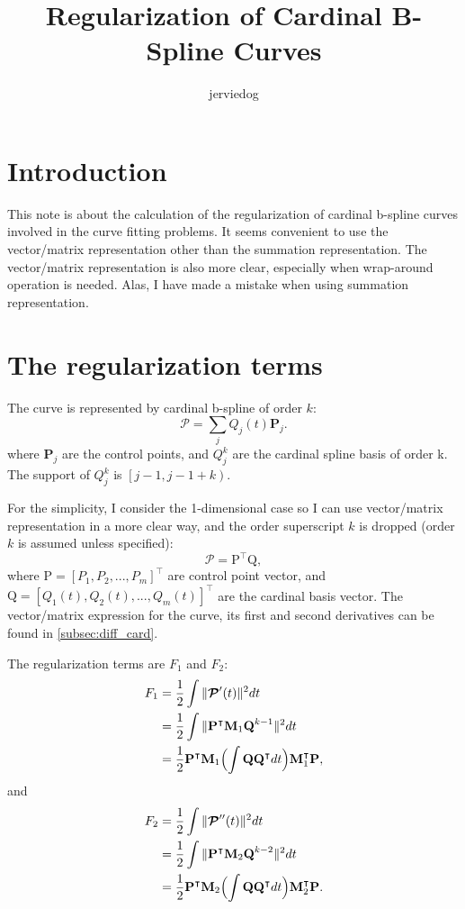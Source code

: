 \documentclass[11pt]{article}
\newcommand{\bmmp}{\bm{\mathcal{P}}} %
\newcommand{\splinept}{\sum_j{Q_j(t)\bm{P}_j}}
\newcommand{\half}{\frac{1}{2}}
\newcommand{\vP}{\bm{\mathrm{P}}} %
\newcommand{\vPT}{\bm{\mathrm{P}}^{\intercal}}
\newcommand{\vQ}{\bm{\mathrm{Q}}} %
\newcommand{\vQT}{\bm{\mathrm{Q}}^{\intercal}} %
\newcommand{\mM}{\mathbf{M}} %
\newcommand{\mMT}{\mathbf{M}^{\intercal}} %
\begin{document}
 
\title{Regularization of Cardinal B-Spline Curves}
\author{jerviedog}
\maketitle

\section{Introduction}
This note is about the calculation of the regularization of cardinal b-spline curves involved in the curve fitting problems. It seems convenient to use the vector/matrix representation other than the summation representation. The vector/matrix representation is also more clear, especially when wrap-around operation is needed. Alas, I have made a mistake when using summation representation.

\section{The regularization terms}
The curve is represented by cardinal b-spline of order $k$:
\[
\bmmp=\splinept.
\]
where $\bm{P}_j$ are the control points, and $Q^k_j$ are the cardinal spline basis of order k. The support of $Q^k_j$ is $\left[j-1,j-1+k\right)$.

For the simplicity, I consider the 1-dimensional case so I can use vector/matrix representation in a more clear way, and the order superscript $k$ is dropped (order $k$ is assumed unless specified):
\[
\bmmp=\vPT\vQ,
\]
where
$\vP = [P_1,P_2,...,P_m]^\intercal$ are control point vector, and $\vQ = [Q_1(t),Q_2(t),...,Q_m(t)]^\intercal$ are the cardinal basis vector. The vector/matrix expression for the curve, its first and second derivatives can be found in \ref{subsec:diff_card}.

The regularization terms are $F_1$ and $F_2$:
\[
\begin{split}
F_1 &= \half \int {\|\bmmp^\prime(t)\|^2 }dt \\
&= \half \int {\| \vPT \mM_1 \vQ^{k-1} \|^2} dt \\
& = \half \vPT \mM_1 \Bigl(\int{\vQ\vQT}dt\Bigr) \mMT_1 \vP,
\end{split}
\]
and
\[
\begin{split}
F_2 &= \half \int{\|\bmmp^{\prime\prime}(t)\|^2}dt \\
&= \half \int {\| \vPT \mM_2 \vQ^{k-2} \|^2} dt \\
& = \half \vPT \mM_2 \Bigl(\int{\vQ\vQT}dt\Bigr) \mMT_2 \vP.
\end{split}
\]
\end{document}

